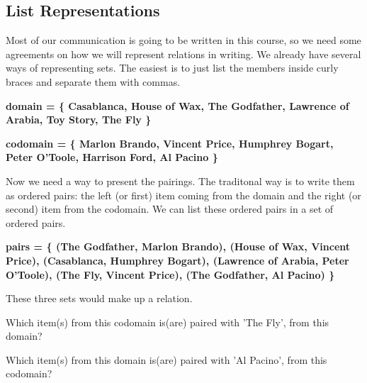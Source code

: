\documentclass{ximera}
\begin{document}
\subsection{List Representations}

Most of our communication is going to be written in this course, so we need some agreements on how we will represent relations in writing.  We already have several ways of representing sets.  The easiest is to just list the members inside curly braces and separate them with commas.

\begin{center} 
\textbf{\textcolor{blue!75!black}{ domain = \{ Casablanca, House of Wax,  The Godfather, Lawrence of Arabia, Toy Story, The Fly \} }}
\end{center}

\begin{center} 
\textbf{\textcolor{blue!75!black}{ codomain = \{ Marlon Brando, Vincent Price, Humphrey Bogart, Peter O'Toole, Harrison Ford, Al Pacino \} }}
\end{center}

Now we need a way to present the pairings.  The traditonal way is to write them as ordered pairs: the left (or first) item coming from the domain and the right (or second) item from the codomain.  We can list these ordered pairs in a set of ordered pairs. 

\begin{center} 
\textbf{\textcolor{blue!75!black}{ pairs = \{ (The Godfather, Marlon Brando), (House of Wax, Vincent Price), (Casablanca, Humphrey Bogart), (Lawrence of Arabia, Peter O'Toole), (The Fly, Vincent Price), (The Godfather, Al Pacino) \}  }}
\end{center}


These three sets would make up a relation. 



\begin{question}

Which item(s) from this codomain is(are) paired with 'The Fly', from this domain?
\begin{selectAll}
\end{selectAll}

\end{question}



\begin{question}

Which item(s) from this domain is(are) paired with 'Al Pacino', from this codomain?
\begin{selectAll}
\end{selectAll}

\end{question}
\end{document}
